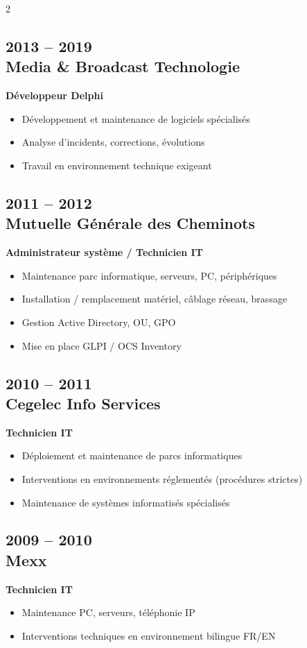 \documentclass[11pt,a4paper]{article}
\begin{document}
\begin{paracol}{2}
\subsection*{2013 -- 2019 \\ Media \& Broadcast Technologie}
\textbf{Développeur Delphi}
\begin{itemize}[leftmargin=*]
  \item Développement et maintenance de logiciels spécialisés
  \item Analyse d'incidents, corrections, évolutions
  \item Travail en environnement technique exigeant
\end{itemize}

\subsection*{2011 -- 2012 \\ Mutuelle Générale des Cheminots}
\textbf{Administrateur système / Technicien IT}
\begin{itemize}[leftmargin=*]
  \item Maintenance parc informatique, serveurs, PC, périphériques
  \item Installation / remplacement matériel, câblage réseau, brassage
  \item Gestion Active Directory, OU, GPO
  \item Mise en place GLPI / OCS Inventory
\end{itemize}

\subsection*{2010 -- 2011 \\ Cegelec Info Services}
\textbf{Technicien IT}
\begin{itemize}[leftmargin=*]
  \item Déploiement et maintenance de parcs informatiques
  \item Interventions en environnements réglementés (procédures strictes)
  \item Maintenance de systèmes informatisés spécialisés
\end{itemize}

\subsection*{2009 -- 2010 \\ Mexx}
\textbf{Technicien IT}
\begin{itemize}[leftmargin=*]
  \item Maintenance PC, serveurs, téléphonie IP
  \item Interventions techniques en environnement bilingue FR/EN
\end{itemize}


\end{paracol}
\end{document}
